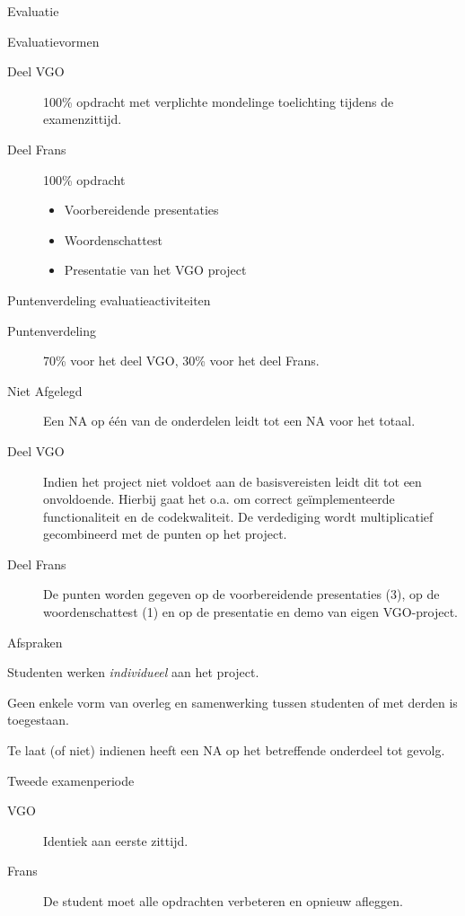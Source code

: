\documentclass{studiewijzer}
\begin{document}
\begin{categorybox}{Evaluatie}
    \begin{category}{Evaluatievormen}
        \begin{description}
            \item[Deel VGO] 100\% opdracht met verplichte mondelinge toelichting tijdens de examenzittijd.
            \item[Deel Frans] 100\% opdracht
                    \begin{itemize}
                    \item Voorbereidende presentaties
                    \item Woordenschattest
                    \item Presentatie van het VGO project
                    \end{itemize}
        \end{description}
    \end{category}
    \begin{category}{Puntenverdeling evaluatieactiviteiten}
        \begin{description}
            \item[Puntenverdeling] 70\% voor het deel VGO, 30\% voor het deel Frans.
            \item[Niet Afgelegd] Een NA op \'e\'en van de onderdelen leidt tot een NA voor het totaal.
            \item[Deel VGO] Indien het project niet voldoet aan de basisvereisten leidt dit tot een onvoldoende.
                    Hierbij gaat het o.a. om correct ge\"implementeerde functionaliteit en de codekwaliteit.
                    De verdediging wordt multiplicatief gecombineerd met de punten op het project.
            \item[Deel Frans] De punten worden gegeven op de voorbereidende
                    presentaties (3), op de woordenschattest (1) en op de presentatie
                    en demo van eigen VGO-project.
        \end{description}
    \end{category}
    \begin{category}{Afspraken}
        \begin{items}
            \item Studenten werken \emph{individueel} aan het project.
            \item Geen enkele vorm van overleg en samenwerking tussen studenten of met derden is toegestaan.
            \item Te laat (of niet) indienen heeft een NA op het betreffende onderdeel tot gevolg.
        \end{items}
    \end{category}
    \begin{category}{Tweede examenperiode}
        \begin{description}
            \item[VGO] Identiek aan eerste zittijd.
            \item[Frans] De student moet alle opdrachten verbeteren en opnieuw afleggen.
        \end{description}
    \end{category}
\end{categorybox}
\end{document}
